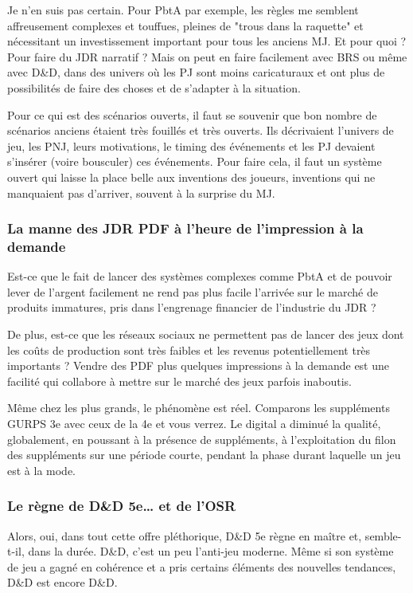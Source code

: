 \documentclass[a4paper, 11pt, twoside]{article}
\begin{document}
Je n'en suis pas certain. Pour PbtA par exemple, les règles me semblent affreusement complexes et touffues, pleines de "trous dans la raquette" et nécessitant un investissement important pour tous les anciens MJ. Et pour quoi ? Pour faire du JDR narratif ? Mais on peut en faire facilement avec BRS ou même avec D\&D, dans des univers où les PJ sont moins caricaturaux et ont plus de possibilités de faire des choses et de s'adapter à la situation.

Pour ce qui est des scénarios ouverts, il faut se souvenir que bon nombre de scénarios anciens étaient très fouillés et très ouverts. Ils décrivaient l'univers de jeu, les PNJ, leurs motivations, le timing des événements et les PJ devaient s'insérer (voire bousculer) ces événements. Pour faire cela, il faut un système ouvert qui laisse la place belle aux inventions des joueurs, inventions qui ne manquaient pas d'arriver, souvent à la surprise du MJ.

\subsubsection{La manne des JDR PDF à l'heure de l'impression à la demande}
\label{sec:orgbb7f8a7}

Est-ce que le fait de lancer des systèmes complexes comme PbtA et de pouvoir lever de l'argent facilement ne rend pas plus facile l'arrivée sur le marché de produits immatures, pris dans l'engrenage financier de l'industrie du JDR ?

De plus, est-ce que les réseaux sociaux ne permettent pas de lancer des jeux dont les coûts de production sont très faibles et les revenus potentiellement très importants ? Vendre des PDF plus quelques impressions à la demande est une facilité qui collabore à mettre sur le marché des jeux parfois inaboutis.

Même chez les plus grands, le phénomène est réel. Comparons les suppléments GURPS 3e avec ceux de la 4e et vous verrez. Le digital a diminué la qualité, globalement, en poussant à la présence de suppléments, à l'exploitation du filon des suppléments sur une période courte, pendant la phase durant laquelle un jeu est à la mode.

\subsubsection{Le règne de D\&D 5e\ldots{} et de l'OSR}
\label{sec:org9f86220}

Alors, oui, dans tout cette offre pléthorique, D\&D 5e règne en maître et, semble-t-il, dans la durée. D\&D, c'est un peu l'anti-jeu moderne. Même si son système de jeu a gagné en cohérence et a pris certains éléments des nouvelles tendances, D\&D est encore D\&D.
\end{document}
